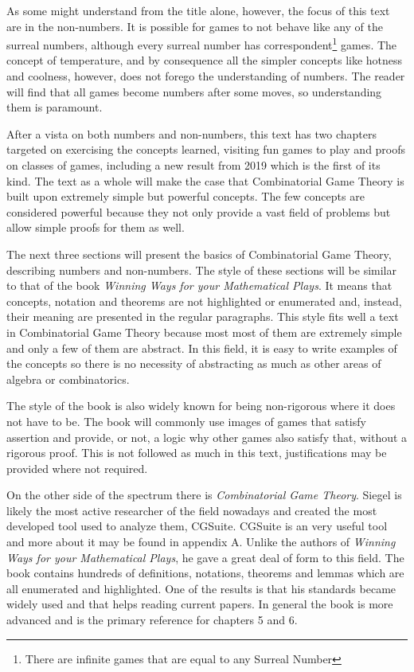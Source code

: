 As some might understand from the title alone, however, the focus of this text are in the non-numbers. It is possible for games to not behave like any of the surreal numbers, although every surreal number has correspondent\footnote{There are infinite games that are equal to any Surreal Number} games. The concept of temperature, and by consequence all the simpler concepts like hotness and coolness, however, does not forego the understanding of numbers. The reader will find that all games become numbers after some moves, so understanding them is paramount.

After a vista on both numbers and non-numbers, this text has two chapters targeted on exercising the concepts learned, visiting fun games to play and proofs on classes of games, including a new result from 2019 which is the first of its kind. The text as a whole will make the case that Combinatorial Game Theory is built upon extremely simple but powerful concepts. The few concepts are considered powerful because they not only provide a vast field of problems but allow simple proofs for them as well.

The next three sections will present the basics of Combinatorial Game Theory, describing numbers and non-numbers. The style of these sections will be similar to that of the book \textit{Winning Ways for your Mathematical Plays}\cite{WW}. It means that concepts, notation and theorems are not highlighted or enumerated and, instead, their meaning are presented in the regular paragraphs. This style fits well a text in Combinatorial Game Theory because most most of them are extremely simple and only a few of them are abstract. In this field, it is easy to write examples of the concepts so there is no necessity of abstracting as much as other areas of algebra or combinatorics.

The style of the book is also widely known for being non-rigorous where it does not have to be. The book will commonly use images of games that satisfy assertion and provide, or not, a logic why other games also satisfy that, without a rigorous proof. This is not followed as much in this text, justifications may be provided where not required. 

On the other side of the spectrum there is \textit{Combinatorial Game Theory}\cite{CGT}. Siegel is likely the most active researcher of the field nowadays and created the most developed tool used to analyze them, CGSuite. CGSuite is an very useful tool and more about it may be found in appendix A. Unlike the authors of \textit{Winning Ways for your Mathematical Plays}, he gave a great deal of form to this field. The book contains hundreds of definitions, notations, theorems and lemmas which are all enumerated and highlighted. One of the results is that his standards became widely used and that helps reading current papers. In general the book is more advanced and is the primary reference for chapters 5 and 6.

